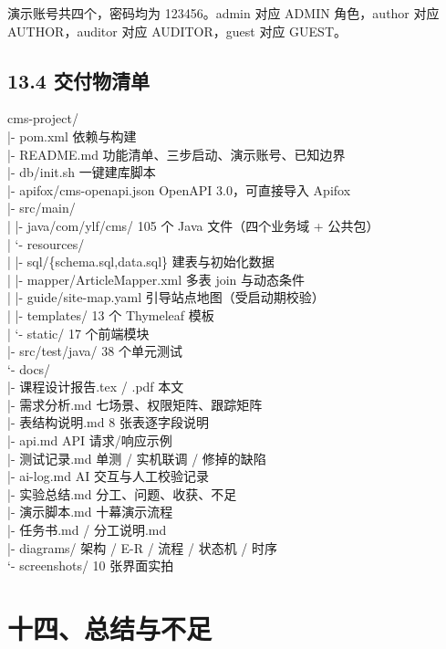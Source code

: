 \documentclass[zihao=-4,UTF8,openany]{ctexart}
\renewcommand{\_}{\textunderscore\allowbreak}
\begin{document}
演示账号共四个，密码均为 123456。admin 对应 ADMIN 角色，author 对应 AUTHOR，auditor 对应 AUDITOR，guest 对应 GUEST。

\subsection*{\texorpdfstring{\textbf{13.4 交付物清单}}{13.4 交付物清单}}\label{ux4ea4ux4ed8ux7269ux6e05ux5355}

cms-project/\\
|- pom.xml 依赖与构建\\
|- README.md 功能清单、三步启动、演示账号、已知边界\\
|- db/init.sh 一键建库脚本\\
|- apifox/cms-openapi.json OpenAPI 3.0，可直接导入 Apifox\\
|- src/main/\\
| |- java/com/ylf/cms/ 105 个 Java 文件（四个业务域 + 公共包）\\
| `- resources/\\
| |- sql/\{schema.sql,data.sql\} 建表与初始化数据\\
| |- mapper/ArticleMapper.xml 多表 join 与动态条件\\
| |- guide/site-map.yaml 引导站点地图（受启动期校验）\\
| |- templates/ 13 个 Thymeleaf 模板\\
| `- static/ 17 个前端模块\\
|- src/test/java/ 38 个单元测试\\
`- docs/\\
|- 课程设计报告.tex / .pdf 本文\\
|- 需求分析.md 七场景、权限矩阵、跟踪矩阵\\
|- 表结构说明.md 8 张表逐字段说明\\
|- api.md API 请求/响应示例\\
|- 测试记录.md 单测 / 实机联调 / 修掉的缺陷\\
|- ai-log.md AI 交互与人工校验记录\\
|- 实验总结.md 分工、问题、收获、不足\\
|- 演示脚本.md 十幕演示流程\\
|- 任务书.md / 分工说明.md\\
|- diagrams/ 架构 / E-R / 流程 / 状态机 / 时序\\
`- screenshots/ 10 张界面实拍

\section*{\texorpdfstring{\textbf{十四、总结与不足}}{十四、总结与不足}}\label{ux5341ux4e09ux603bux7ed3ux4e0eux4e0dux8db3}
\end{document}
